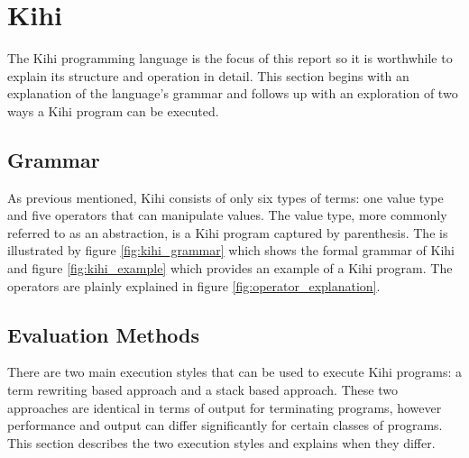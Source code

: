
\section{Kihi}
The Kihi programming language is the focus of this report so it is worthwhile to explain its structure and operation in detail. This section begins with an explanation of the language's grammar and follows up with an exploration of two ways a Kihi program can be executed.

\subsection{Grammar}
As previous mentioned, Kihi consists of only six types of terms: one value type and five operators that can manipulate values. The value type, more commonly referred to as an abstraction, is a Kihi program captured by parenthesis. The is illustrated by figure \ref{fig:kihi_grammar} which shows the formal grammar of Kihi and figure \ref{fig:kihi_example} which provides an example of a Kihi program. The operators are plainly explained in figure \ref{fig:operator_explanation}.








\subsection{Evaluation Methods}
There are two main execution styles that can be used to execute Kihi programs: a term rewriting based approach and a stack based approach. These two approaches are identical in terms of output for terminating programs, however performance and output can differ significantly for certain classes of programs. This section describes the two execution styles and explains when they differ.

